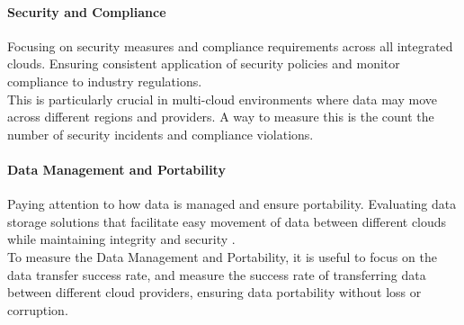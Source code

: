 
\paragraph{Security and Compliance}
Focusing on security measures and compliance requirements across all integrated clouds. 
Ensuring consistent application of security policies and monitor compliance to 
industry regulations. \\
This is particularly crucial in multi-cloud environments 
where data may move across different regions and providers.
A way to measure this is the count the number of security incidents and compliance violations.

\paragraph{Data Management and Portability}
Paying attention to how data is managed and ensure portability. 
Evaluating data storage solutions that facilitate easy movement of 
data between different clouds while maintaining integrity and security\cite{ramalingamAddressingSemanticsStandards2021} \cite{}.\\
To measure the Data Management and Portability, it is useful to 
focus on the data transfer success rate,
and measure the success rate of transferring data between different cloud providers, 
ensuring data portability without loss or corruption.



